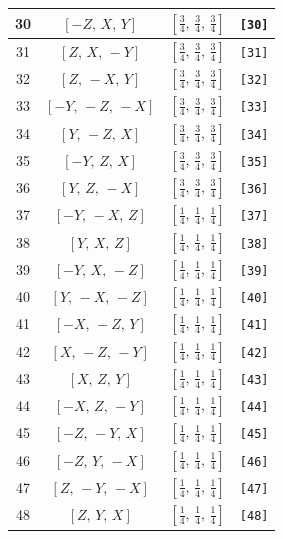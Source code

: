 \documentclass[fleqn,8pt]{jsarticle}
\begin{document}
\begin{longtable}{cccc}
30 & $\left[ - Z,\, X,\, Y \right]$ & $\left[ \frac{3}{4},\, \frac{3}{4},\, \frac{3}{4} \right]$ & {\tt [30]} \\ \hline
31 & $\left[ Z,\, X,\, - Y \right]$ & $\left[ \frac{3}{4},\, \frac{3}{4},\, \frac{3}{4} \right]$ & {\tt [31]} \\ \hline
32 & $\left[ Z,\, - X,\, Y \right]$ & $\left[ \frac{3}{4},\, \frac{3}{4},\, \frac{3}{4} \right]$ & {\tt [32]} \\ \hline
33 & $\left[ - Y,\, - Z,\, - X \right]$ & $\left[ \frac{3}{4},\, \frac{3}{4},\, \frac{3}{4} \right]$ & {\tt [33]} \\ \hline
34 & $\left[ Y,\, - Z,\, X \right]$ & $\left[ \frac{3}{4},\, \frac{3}{4},\, \frac{3}{4} \right]$ & {\tt [34]} \\ \hline
35 & $\left[ - Y,\, Z,\, X \right]$ & $\left[ \frac{3}{4},\, \frac{3}{4},\, \frac{3}{4} \right]$ & {\tt [35]} \\ \hline
36 & $\left[ Y,\, Z,\, - X \right]$ & $\left[ \frac{3}{4},\, \frac{3}{4},\, \frac{3}{4} \right]$ & {\tt [36]} \\ \hline
37 & $\left[ - Y,\, - X,\, Z \right]$ & $\left[ \frac{1}{4},\, \frac{1}{4},\, \frac{1}{4} \right]$ & {\tt [37]} \\ \hline
38 & $\left[ Y,\, X,\, Z \right]$ & $\left[ \frac{1}{4},\, \frac{1}{4},\, \frac{1}{4} \right]$ & {\tt [38]} \\ \hline
39 & $\left[ - Y,\, X,\, - Z \right]$ & $\left[ \frac{1}{4},\, \frac{1}{4},\, \frac{1}{4} \right]$ & {\tt [39]} \\ \hline
40 & $\left[ Y,\, - X,\, - Z \right]$ & $\left[ \frac{1}{4},\, \frac{1}{4},\, \frac{1}{4} \right]$ & {\tt [40]} \\ \hline
41 & $\left[ - X,\, - Z,\, Y \right]$ & $\left[ \frac{1}{4},\, \frac{1}{4},\, \frac{1}{4} \right]$ & {\tt [41]} \\ \hline
42 & $\left[ X,\, - Z,\, - Y \right]$ & $\left[ \frac{1}{4},\, \frac{1}{4},\, \frac{1}{4} \right]$ & {\tt [42]} \\ \hline
43 & $\left[ X,\, Z,\, Y \right]$ & $\left[ \frac{1}{4},\, \frac{1}{4},\, \frac{1}{4} \right]$ & {\tt [43]} \\ \hline
44 & $\left[ - X,\, Z,\, - Y \right]$ & $\left[ \frac{1}{4},\, \frac{1}{4},\, \frac{1}{4} \right]$ & {\tt [44]} \\ \hline
45 & $\left[ - Z,\, - Y,\, X \right]$ & $\left[ \frac{1}{4},\, \frac{1}{4},\, \frac{1}{4} \right]$ & {\tt [45]} \\ \hline
46 & $\left[ - Z,\, Y,\, - X \right]$ & $\left[ \frac{1}{4},\, \frac{1}{4},\, \frac{1}{4} \right]$ & {\tt [46]} \\ \hline
47 & $\left[ Z,\, - Y,\, - X \right]$ & $\left[ \frac{1}{4},\, \frac{1}{4},\, \frac{1}{4} \right]$ & {\tt [47]} \\ \hline
48 & $\left[ Z,\, Y,\, X \right]$ & $\left[ \frac{1}{4},\, \frac{1}{4},\, \frac{1}{4} \right]$ & {\tt [48]} \\
\end{longtable}
\end{document}
